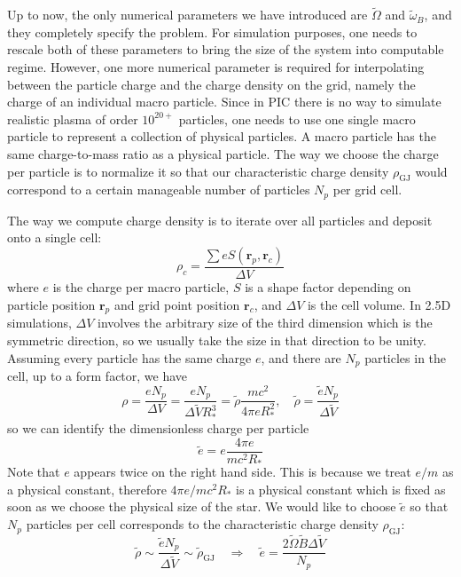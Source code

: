 Up to now, the only numerical parameters we have introduced are $\tilde{\Omega}$
and $\tilde{\omega}_B$, and they completely specify the problem. For simulation
purposes, one needs to rescale both of these parameters to bring the size of the
system into computable regime. However, one more numerical parameter is required
for interpolating between the particle charge and the charge density on the
grid, namely the charge of an individual macro particle. Since in PIC there is
no way to simulate realistic plasma of order $10^{20+}$ particles, one needs to
use one single macro particle to represent a collection of physical particles. A
macro particle has the same charge-to-mass ratio as a physical particle. The way
we choose the charge per particle is to normalize it so that our characteristic
charge density $\rho_\mathrm{GJ}$ would correspond to a certain manageable
number of particles $N_p$ per grid cell.

The way we compute charge density is to iterate over all particles and deposit
onto a single cell:
\begin{equation}
    \rho_c = \frac{\sum e S(\mathbf{r}_p, \mathbf{r}_c)}{\Delta V}
\end{equation}
where $e$ is the charge per macro particle, $S$ is a shape factor depending on
particle position $\mathbf{r}_p$ and grid point position $\mathbf{r}_c$, and
$\Delta V$ is the cell volume. In 2.5D simulations, $\Delta V$ involves the
arbitrary size of the third dimension which is the symmetric direction, so we
usually take the size in that direction to be unity. Assuming every particle has
the same charge $e$, and there are $N_p$ particles in the cell, up to a form
factor, we have
\begin{equation}
    \rho = \frac{e N_p}{\Delta V} = \frac{e N_p}{\Delta \tilde{V} R_{*}^{3}} = \tilde{\rho}\frac{mc^2}{4\pi eR_{*}^2}, \quad \tilde{\rho} = \frac{\tilde{e}N_p}{\Delta \tilde{V}}
\end{equation}
so we can identify the dimensionless charge per particle
\begin{equation}
    \tilde{e} = e \frac{4\pi e}{mc^2R_{*}}
\end{equation}
Note that $e$ appears twice on the right hand side. This is because we treat
$e/m$ as a physical constant, therefore $4\pi e / mc^2R_{*}$ is a physical
constant which is fixed as soon as we choose the physical size of the star. We would
like to choose $\tilde{e}$ so that $N_p$ particles per cell corresponds to the
characteristic charge density $\rho_\mathrm{GJ}$:
\begin{equation}
    \tilde{\rho} \sim \frac{\tilde{e} N_p}{\Delta \tilde{V}} \sim \tilde{\rho}_\mathrm{GJ} \quad \Longrightarrow \quad \tilde{e} = \frac{2\tilde{\Omega} \tilde{B}\Delta \tilde{V}}{N_p}
\end{equation}


